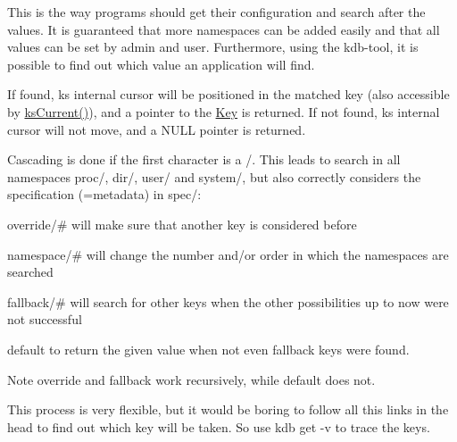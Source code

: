 \begin{DoxyCodeInclude}
\end{DoxyCodeInclude}
 This is the way programs should get their configuration and search after the values. It is guaranteed that more namespaces can be added easily and that all values can be set by admin and user. Furthermore, using the kdb-\/tool, it is possible to find out which value an application will find.

If found, {\ttfamily ks} internal cursor will be positioned in the matched key (also accessible by \hyperlink{group__keyset_ga4287b9416912c5f2ab9c195cb74fb094}{ks\+Current()}), and a pointer to the \hyperlink{classkdb_1_1Key}{Key} is returned. If not found, {\ttfamily ks} internal cursor will not move, and a N\+U\+L\+L pointer is returned.

Cascading is done if the first character is a /. This leads to search in all namespaces proc/, dir/, user/ and system/, but also correctly considers the specification (=metadata) in spec/\+:


\begin{DoxyItemize}
\item {\ttfamily override/\#} will make sure that another key is considered before
\item {\ttfamily namespace/\#} will change the number and/or order in which the namespaces are searched
\item {\ttfamily fallback/\#} will search for other keys when the other possibilities up to now were not successful
\item {\ttfamily default} to return the given value when not even {\ttfamily fallback} keys were found.
\end{DoxyItemize}

\begin{DoxyNote}{Note}
override and fallback work recursively, while default does not.
\end{DoxyNote}
This process is very flexible, but it would be boring to follow all this links in the head to find out which key will be taken. So use {\ttfamily kdb get -\/v} to trace the keys.

